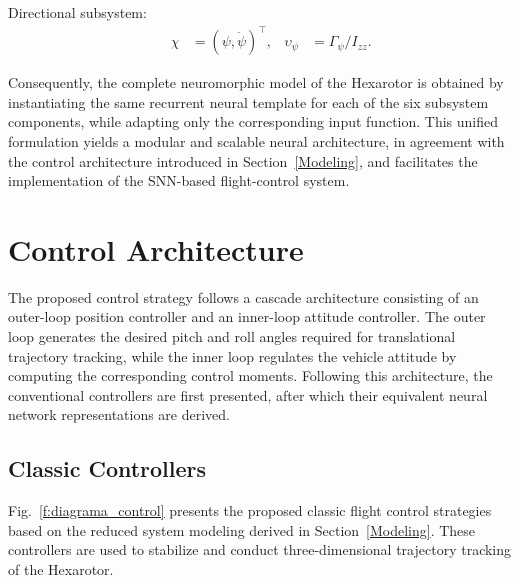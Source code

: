 \documentclass[conference]{IEEEtran}
\begin{document}
Directional subsystem:
\begin{equation*}
\begin{aligned}
& & \chi&=(\psi,\dot\psi)^\top, & \upsilon_\psi&=\Gamma_\psi/I_{zz}.
\end{aligned}
\end{equation*}

Consequently, the complete neuromorphic model of the Hexarotor is obtained by instantiating the same recurrent neural template for each of the six subsystem components, while adapting only the corresponding input function. This unified formulation yields a modular and scalable neural architecture, in agreement with the control architecture introduced in Section~\ref{Modeling}, and facilitates the implementation of the SNN-based flight-control system.




\section{Control Architecture}\label{Control}



The proposed control strategy follows a cascade architecture consisting of an outer-loop position controller and an inner-loop attitude controller. The outer loop generates the desired pitch and roll angles required for translational trajectory tracking, while the inner loop regulates the vehicle attitude by computing the corresponding control moments. Following this architecture, the conventional controllers are first presented, after which their equivalent neural network representations are derived.



\subsection{Classic Controllers}

Fig.~\ref{f:diagrama_control} presents the proposed classic flight control strategies based on the reduced system modeling derived in Section~\ref{Modeling}. These controllers are used to stabilize and conduct three-dimensional trajectory tracking of the Hexarotor.
\end{document}
